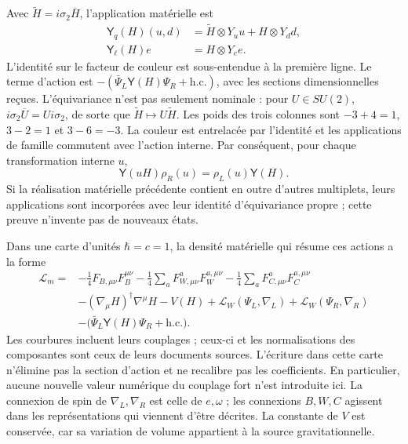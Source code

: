 Avec \(\widetilde H=i\sigma_2\overline H\), l’application matérielle est
\begin{equation}
 \begin{split}
 \mathsf Y_q(H)(u,d)&=
       \widetilde H\otimes Y_u u+H\otimes Y_d d,\\
 \mathsf Y_\ell(H)e&=H\otimes Y_e e .
 \end{split}
 \label{hmtcuatro:yukawa}
\end{equation}
L’identité sur le facteur de couleur est sous-entendue à la première ligne. Le terme d’action est \(-(\bar\Psi_L\mathsf Y(H)\Psi_R+\mathrm{h.c.})\), avec les sections dimensionnelles reçues. L’équivariance n’est pas seulement nominale : pour \(U\in SU(2)\), \(i\sigma_2\overline U=U i\sigma_2\), de sorte que \(\widetilde H\mapsto U\widetilde H\). Les poids des trois colonnes sont \(-3+4=1\), \(3-2=1\) et \(3-6=-3\). La couleur est entrelacée par l’identité et les applications de famille commutent avec l’action interne. Par conséquent, pour chaque transformation interne \(u\),
\begin{equation}
 \mathsf Y(uH)\rho_R(u)=\rho_L(u)\mathsf Y(H).
 \label{hmtcuatro:equivariancia-yukawa}
\end{equation}
Si la réalisation matérielle précédente contient en outre d’autres multiplets, leurs applications sont incorporées avec leur identité d’équivariance propre ; cette preuve n’invente pas de nouveaux états.

Dans une carte d’unités \(\hbar=c=1\), la densité matérielle qui résume ces actions a la forme
\begin{equation}
 \begin{split}
 \mathcal L_m={}&-\frac14 F_{B,\mu\nu}F_B^{\mu\nu}
 -\frac14\sum_a F_{W,\mu\nu}^aF_W^{a,\mu\nu}
 -\frac14\sum_a F_{C,\mu\nu}^aF_C^{a,\mu\nu}\\
 &-(\nabla_\mu H)^\dagger\nabla^\mu H-V(H)
 +\mathcal L_W(\Psi_L,\nabla_L)+\mathcal L_W(\Psi_R,\nabla_R)\\
 &-\bigl(\bar\Psi_L\mathsf Y(H)\Psi_R+\mathrm{h.c.}\bigr).
 \end{split}
 \label{hmtcuatro:densidad-material}
\end{equation}
Les courbures incluent leurs couplages ; ceux-ci et les normalisations des composantes sont ceux de leurs documents sources. L’écriture dans cette carte n’élimine pas la section d’action et ne recalibre pas les coefficients. En particulier, aucune nouvelle valeur numérique du couplage fort n’est introduite ici. La connexion de spin de \(\nabla_L,\nabla_R\) est celle de \(e,\omega\) ; les connexions \(B,W,C\) agissent dans les représentations qui viennent d’être décrites. La constante de \(V\) est conservée, car sa variation de volume appartient à la source gravitationnelle.

